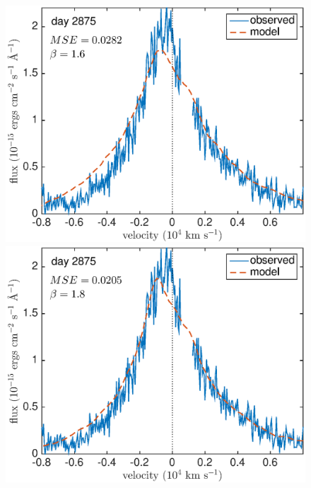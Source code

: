 \begin{figure}
\centering

\includegraphics[clip = true, scale=0.43, trim=10 0 45 0]{chapters/chapter5/images/MSE/d2875_B/d2875_B1_6}
\includegraphics[clip = true, scale=0.43, trim=42 0 45 0]{chapters/chapter5/images/MSE/d2875_B/d2875_B1_8}


\end{figure}
